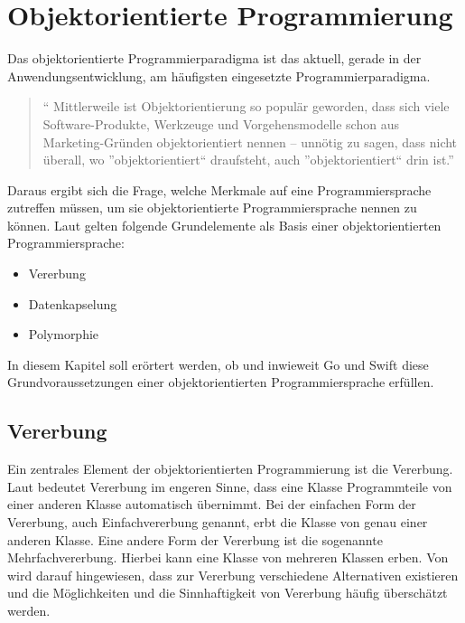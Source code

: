 \chapter{Objektorientierte Programmierung}
Das objektorientierte Programmierparadigma ist das aktuell, gerade in der Anwendungsentwicklung, am häufigsten eingesetzte Programmierparadigma.

\begin{quote}
\enquote{
Mittlerweile ist Objektorientierung so populär geworden, dass sich viele Software-Produkte, Werkzeuge und Vorgehensmodelle schon aus Marketing-Gründen objektorientiert nennen – unnötig zu sagen, dass nicht überall, wo ”objektorientiert“ draufsteht, auch ”objektorientiert“ drin ist.} 
\cite[S.16]{PoetzschHeffter.2009}
\end{quote}

Daraus ergibt sich die Frage, welche Merkmale auf eine Programmiersprache zutreffen müssen, um sie objektorientierte Programmiersprache nennen zu können.
Laut \cite{Lahres.2011} gelten folgende Grundelemente als Basis einer objektorientierten Programmiersprache:

\begin{itemize}
    \item Vererbung
    \item Datenkapselung
    \item Polymorphie
\end{itemize}

In diesem Kapitel soll erörtert werden, ob und inwieweit Go und Swift diese Grundvoraussetzungen einer objektorientierten Programmiersprache erfüllen.

\section{Vererbung}
Ein zentrales Element der objektorientierten Programmierung ist die Vererbung. 
Laut \cite[S.145]{PoetzschHeffter.2009} bedeutet Vererbung im engeren Sinne, dass eine Klasse Programmteile von einer anderen Klasse automatisch übernimmt. 
Bei der einfachen Form der Vererbung, auch Einfachvererbung genannt, erbt die Klasse von genau einer anderen Klasse.
Eine andere Form der Vererbung ist die sogenannte Mehrfachvererbung. 
Hierbei kann eine Klasse von mehreren Klassen erben.
Von \cite[S.41]{Oestereich.1999} wird darauf hingewiesen, dass zur Vererbung  verschiedene Alternativen existieren und die Möglichkeiten und die Sinnhaftigkeit von Vererbung häufig überschätzt werden.


